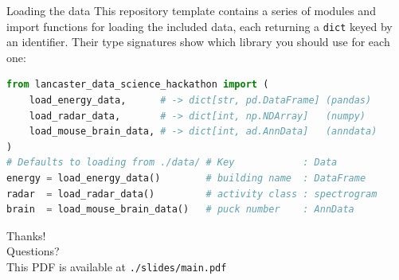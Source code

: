 \begin{frame}[fragile]{Loading the data}
  This repository template contains a series of modules and import functions for loading the included data, each returning a \texttt{dict} keyed by an identifier. Their type signatures show which library you should use for each one:
  \begin{lstlisting}[language=Python]
from lancaster_data_science_hackathon import (
    load_energy_data,      # -> dict[str, pd.DataFrame] (pandas)
    load_radar_data,       # -> dict[int, np.NDArray]   (numpy)
    load_mouse_brain_data, # -> dict[int, ad.AnnData]   (anndata)
)
# Defaults to loading from ./data/ # Key            : Data
energy = load_energy_data()        # building name  : DataFrame
radar  = load_radar_data()         # activity class : spectrogram
brain  = load_mouse_brain_data()   # puck number    : AnnData
  \end{lstlisting}
\end{frame}

\begin{frame}[standout]
  Thanks!\\[1ex]
  \small Questions? \\ 
  \vspace{24pt}
  This PDF is available at \texttt{./slides/main.pdf}
\end{frame}


